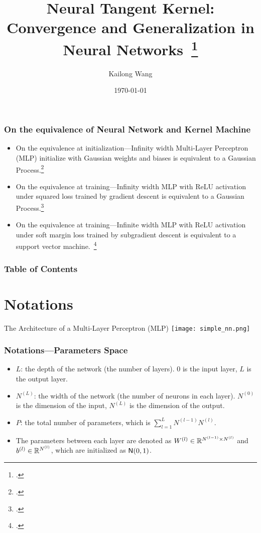 \documentclass[10pt]{../../formats/RU}
\title[Neural Tangent Kernel]{Neural Tangent Kernel: Convergence and Generalization in Neural Networks~\footcite{Jacot2020}
}
\author[Kai] %
{Kailong Wang\inst{$\dagger$}
}
\institute[Rutgers] %
{
    \inst{$\dagger$}%
    Rutgers University
}
\date[\today] %
{
    \today
}
\begin{document}
\frame{\titlepage}

\begin{frame}
    \frametitle{On the equivalence of Neural Network and Kernel Machine}
    \begin{itemize}
        \item On the equivalence at initialization---Infinity width Multi-Layer Perceptron (MLP) initialize with Gaussian weights and biases is equivalent to a Gaussian Process.\footcite{Lee2018}
        \item On the equivalence at training---Infinity width MLP with ReLU activation under squared loss trained by gradient descent is equivalent to a Gaussian Process.\footcite{Jacot2020}
        \item On the equivalence at training---Infinite width MLP with ReLU activation under soft margin loss trained by subgradient descent is equivalent to a support vector machine.~\footcite{Chen2021}
    \end{itemize}
\end{frame}

\begin{frame}
\frametitle{Table of Contents}
\tableofcontents
\end{frame}


\section{Notations}
\begin{frame}
    {The Architecture of a Multi-Layer Perceptron (MLP)}
    \texttt{[image: simple\_nn.png]}
\end{frame}

\begin{frame}
    \frametitle{Notations---Parameters Space}
    \begin{itemize}
        \item $L$: the depth of the network (\aka the number of layers). \Eg $0$ is the input layer, $L$ is the output layer.
        \item $N^{(L)}$: the width of the network (\aka the number of neurons in each layer). \Eg $N^{(0)}$ is the dimension of the input, $N^{(L)}$ is the dimension of the output.
        \item $P$: the total number of parameters, which is $\sum_{l=1}^L N^{(l-1)}N^{(l)}$.
        \item The parameters between each layer are denoted as $W^{(l)}\in\mathbb{R}^{N^{(l-1)}\times N^{(l)}}$ and $b^{(l)}\in\mathbb{R}^{N^{(l)}}$, which are initialized as \iid $\mathsf{N}(0,1)$.
    \end{itemize}
\end{frame}
\end{document}
